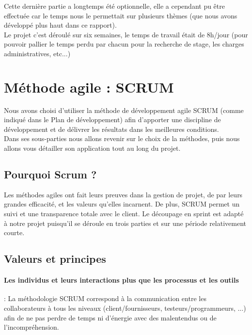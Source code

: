 Cette dernière partie a longtemps été optionnelle, elle a cependant pu être effectuée car le temps nous le permettait sur plusieurs thèmes (que nous avons développé plus haut dans ce rapport).\\

Le projet c'est déroulé sur six semaines, le temps de travail était de 8h/jour (pour pouvoir pallier le temps perdu par chacun pour la recherche de stage, les charges administratives, etc...)

\section{Méthode agile : SCRUM}

Nous avons choisi d'utiliser la méthode de développement agile SCRUM (comme indiqué dans le Plan de développement) afin d'apporter une discipline de développement et de délivrer les résultats dans les meilleures conditions.\\
Dans ses sous-parties nous allons revenir sur le choix de la méthodes, puis nous allons vous détailler son application tout au long du projet.

\subsection{Pourquoi Scrum ?}

Les méthodes agiles ont fait leurs preuves dans la gestion de projet, de par leurs grandes efficacité, et les valeurs qu'elles incarnent. De plus, SCRUM permet un suivi et une transparence totale avec le client. Le découpage en sprint est adapté à notre projet puisqu'il se déroule en trois parties et sur une période relativement courte.

\subsection{Valeurs et principes}

\paragraph{Les individus et leurs interactions plus que les processus et les outils} : La méthodologie SCRUM correspond à la communication entre les collaborateurs à tous les niveaux (client/fournisseurs, testeurs/programmeurs, ...) afin de ne pas perdre de temps ni d'énergie avec des malentendus ou de l'incompréhension.\\

